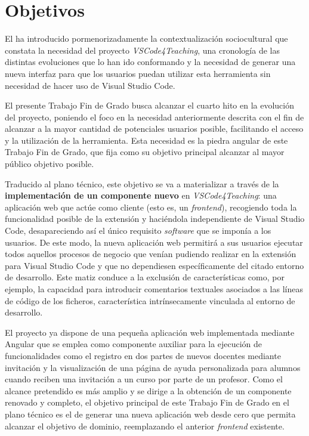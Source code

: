 \chapter{Objetivos}
\label{cap:objetivos}

El  ha introducido pormenorizadamente la contextualización sociocultural que constata la necesidad del proyecto \textit{VSCode4Teaching}, una cronología de las distintas evoluciones que lo han ido conformando y la necesidad de generar una nueva interfaz para que los usuarios puedan utilizar esta herramienta sin necesidad de hacer uso de Visual Studio Code.

El presente Trabajo Fin de Grado busca alcanzar el cuarto hito en la evolución del proyecto, poniendo el foco en la necesidad anteriormente descrita con el fin de alcanzar a la mayor cantidad de potenciales usuarios posible, facilitando el acceso y la utilización de la herramienta. Esta necesidad es la piedra angular de este Trabajo Fin de Grado, que fija como su objetivo principal alcanzar al mayor público objetivo posible.

Traducido al plano técnico, este objetivo se va a materializar a través de la \textbf{implementación de un componente nuevo} en \textit{VSCode4Teaching}: una aplicación web que actúe como cliente (esto es, un \textit{frontend}), recogiendo toda la funcionalidad posible de la extensión y haciéndola independiente de Visual Studio Code, desapareciendo así el único requisito \textit{software} que se imponía a los usuarios. De este modo, la nueva aplicación web permitirá a sus usuarios ejecutar todos aquellos procesos de negocio que venían pudiendo realizar en la extensión para Visual Studio Code y que no dependiesen específicamente del citado entorno de desarrollo. Este matiz conduce a la exclusión de características como, por ejemplo, la capacidad para introducir comentarios textuales asociados a las líneas de código de los ficheros, característica intrínsecamente vinculada al entorno de desarrollo.

El proyecto ya dispone de una pequeña aplicación web implementada mediante Angular que se emplea como componente auxiliar para la ejecución de funcionalidades como el registro en dos partes de nuevos docentes mediante invitación y la visualización de una página de ayuda personalizada para alumnos cuando reciben una invitación a un curso por parte de un profesor. Como el alcance pretendido es más amplio y se dirige a la obtención de un componente renovado y completo, el objetivo principal de este Trabajo Fin de Grado en el plano técnico es el de generar una nueva aplicación web desde cero que permita alcanzar el objetivo de dominio, reemplazando el anterior \textit{frontend} existente.

